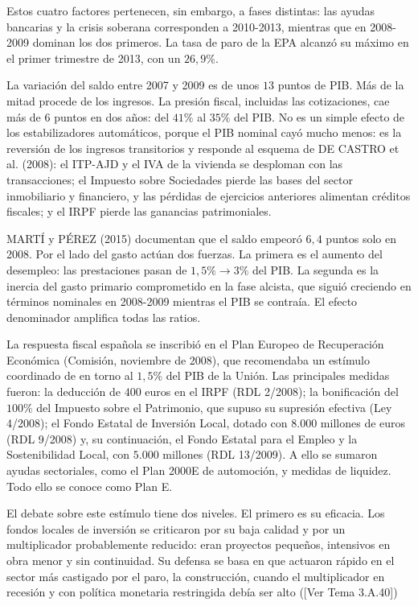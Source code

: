\documentclass[10pt,a4paper]{article}
\newcommand{\authorfont}[1]{{\fontfamily{EBGaramond-TLF}\selectfont #1}}
\begin{document}
Estos cuatro factores pertenecen, sin embargo, a fases distintas: las ayudas bancarias y la crisis soberana corresponden a 2010-2013, mientras que en 2008-2009 dominan los dos primeros. La tasa de paro de la EPA alcanzó su máximo en el primer trimestre de 2013, con un $26,9\%$.

La variación del saldo entre 2007 y 2009 es de unos $13$ puntos de PIB. Más de la mitad procede de los ingresos. La presión fiscal, incluidas las cotizaciones, cae más de $6$ puntos en dos años: del $41\%$ al $35\%$ del PIB. No es un simple efecto de los estabilizadores automáticos, porque el PIB nominal cayó mucho menos: es la reversión de los ingresos transitorios y responde al esquema de DE CASTRO et al. (2008): el ITP-AJD y el IVA de la vivienda se desploman con las transacciones; el Impuesto sobre Sociedades pierde las bases del sector inmobiliario y financiero, y las pérdidas de ejercicios anteriores alimentan créditos fiscales; y el IRPF pierde las ganancias patrimoniales.

MARTÍ y PÉREZ (2015) documentan que el saldo empeoró $6,4$ puntos solo en 2008. Por el lado del gasto actúan dos fuerzas. La primera es el aumento del desempleo: las prestaciones pasan de $1,5\%\to3\%$ del PIB. La segunda es la inercia del gasto primario comprometido en la fase alcista, que siguió creciendo en términos nominales en 2008-2009 mientras el PIB se contraía. El efecto denominador amplifica todas las ratios.

La respuesta fiscal española se inscribió en el Plan Europeo de Recuperación Económica (Comisión, noviembre de 2008), que recomendaba un estímulo coordinado de en torno al $1,5\%$ del PIB de la Unión. Las principales medidas fueron: la deducción de $400$ euros en el IRPF (RDL 2/2008); la bonificación del $100\%$ del Impuesto sobre el Patrimonio, que supuso su supresión efectiva (Ley 4/2008); el Fondo Estatal de Inversión Local, dotado con $8.000$ millones de euros (RDL 9/2008) y, su continuación, el Fondo Estatal para el Empleo y la Sostenibilidad Local, con $5.000$ millones (RDL 13/2009). A ello se sumaron ayudas sectoriales, como el Plan 2000E de automoción, y medidas de liquidez. Todo ello se conoce como Plan E.

El debate sobre este estímulo tiene dos niveles. El primero es su eficacia. Los fondos locales de inversión se criticaron por su baja calidad y por un multiplicador probablemente reducido: eran proyectos pequeños, intensivos en obra menor y sin continuidad. Su defensa se basa en que actuaron rápido en el sector más castigado por el paro, la construcción, cuando el multiplicador en recesión y con política monetaria restringida debía ser alto ([\authorfont{Ver Tema 3.A.40}])
\end{document}
